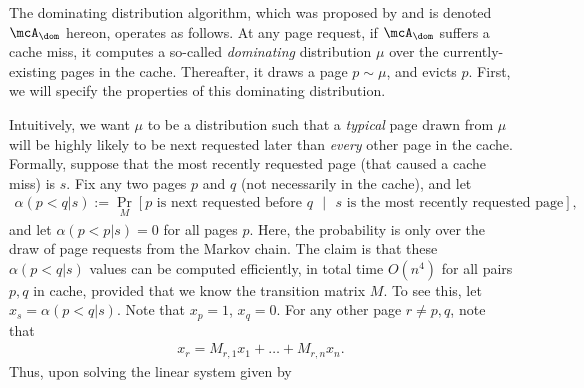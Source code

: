 The dominating distribution algorithm, which was proposed by \cite{lund1999paging} and is denoted $\mcA_\dom$ hereon, operates as follows. At any page request, if $\mcA_\dom$ suffers a cache miss, it computes a so-called \textit{dominating} distribution $\mu$ over the currently-existing pages in the cache. Thereafter, it draws a page $p \sim \mu$, and evicts $p$. First, we will specify the properties of this dominating distribution. 

Intuitively, we want $\mu$ to be a distribution such that a \textit{typical} page drawn from $\mu$ will be highly likely to be next requested later than \textit{every} other page in the cache. Formally, suppose that the most recently requested page (that caused a cache miss) is $s$. Fix any two pages $p$ and $q$ (not necessarily in the cache), and let
\begin{align}
    \label{eqn:alpha-q-p-def}
    \alpha(p<q|s) := \Pr_M[\text{$p$ is next requested before $q$ }|\text{ $s$ is the most recently requested page}],
\end{align}
and let $\alpha(p<p|s)=0$ for all pages $p$. Here, the probability is only over the draw of page requests from the Markov chain.
The claim is that these $\alpha(p<q|s)$ values can be computed efficiently, in total time $O(n^4)$ for all pairs $p,q$ in cache, provided that we know the transition matrix $M$. To see this, let $x_s=\alpha(p<q|s)$. Note that $x_p=1$, $x_q=0$. For any other page $r \neq p,q$, note that
\begin{align*}
    x_r = M_{r,1}x_1 + \dots + M_{r,n}x_n.
\end{align*}
Thus, upon solving the linear system given by
